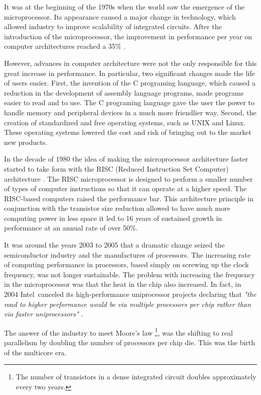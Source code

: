 It was at the beginning of the 1970s  when the world saw the emergence of the
microprocessor. Its appearance caused a major change in technology, which
allowed industry to improve scalability of integrated circuits. After the
introduction of the microprocessor, the improvement in performance per year on
computer architectures reached a 35\% \cite{Hennessy}.

However, advances in computer architecture were not the only responsible for
this great increase in performance. In particular, two significant changes made
the life of users easier. First, the invention of the C programing language, 
which caused a reduction in the development of assembly language programs, made
programs easier to read and to use. The C programing language gave the user the power to
handle memory and peripheral devices in a much more friendlier way. Second, the
creation of standardized and free  operating systems, such as UNIX and Linux.
These operating systems lowered the cost and risk of bringing out to the market
new products.

In the decade of 1980 the idea of making the microprocessor architecture faster
started to take form with the RISC (Reduced Instruction Set Computer)
architecture \cite{Hennessy}.  The RISC microprocessor is designed to perform a
smaller number of types of computer instructions so that it can operate at a
higher speed.  The RISC-based computers raised the performance bar. This
architecture principle in conjunction with the transistor size reduction
allowed to have much more computing power in less space it led to 16 years of
sustained growth in performance at an annual rate of over 50\%.

It was around the years 2003 to 2005 that a dramatic change seized the
semiconductor industry and the manufactures of processors. The increasing rate
of computing performance in processors, based simply on screwing up the clock
frequency, was not longer sustainable. The problem with increasing the
frequency in the microprocessor was that the heat in the chip also increased. In
fact, in 2004 Intel\textregistered\ canceled its high-performance uniprocessor
projects declaring that \textit{"the road to higher performance would be via
multiple processors per chip rather than via faster uniprocessors"} \cite{Hennessy}.

The answer of the industry to  meet Moore's law \footnote{The number of
transistors in a dense integrated circuit doubles approximately every two
years\cite{Mack}.}, was the shifting to real parallelism by doubling the number of
processors per chip die. This was the birth of the multicore era. 

